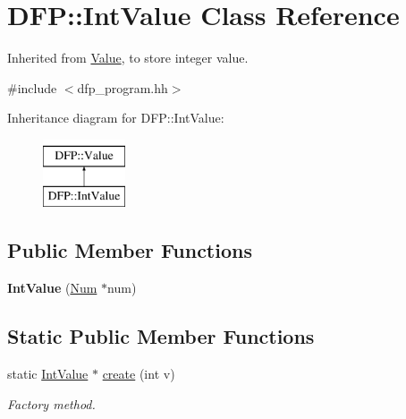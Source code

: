 \hypertarget{class_d_f_p_1_1_int_value}{}\section{D\+FP\+:\+:Int\+Value Class Reference}
\label{class_d_f_p_1_1_int_value}


Inherited from \hyperlink{class_d_f_p_1_1_value}{Value}, to store integer value.  




{\ttfamily \#include $<$dfp\+\_\+program.\+hh$>$}

Inheritance diagram for D\+FP\+:\+:Int\+Value\+:\begin{figure}[H]
\begin{center}
\leavevmode
\includegraphics[height=2.000000cm]{class_d_f_p_1_1_int_value}
\end{center}
\end{figure}
\subsection*{Public Member Functions}
\begin{DoxyCompactItemize}
\item 
{\bfseries Int\+Value} (\hyperlink{class_d_f_p_1_1_num}{Num} $\ast$num)\hypertarget{class_d_f_p_1_1_int_value_a088713807e54057ffe84ae332df4d599}{}\label{class_d_f_p_1_1_int_value_a088713807e54057ffe84ae332df4d599}

\end{DoxyCompactItemize}
\subsection*{Static Public Member Functions}
\begin{DoxyCompactItemize}
\item 
static \hyperlink{class_d_f_p_1_1_int_value}{Int\+Value} $\ast$ \hyperlink{class_d_f_p_1_1_int_value_ae48acabd98ba7073ef807f982ebf0964}{create} (int v)\hypertarget{class_d_f_p_1_1_int_value_ae48acabd98ba7073ef807f982ebf0964}{}\label{class_d_f_p_1_1_int_value_ae48acabd98ba7073ef807f982ebf0964}

\begin{DoxyCompactList}\small\item\em Factory method. \end{DoxyCompactList}\end{DoxyCompactItemize}
